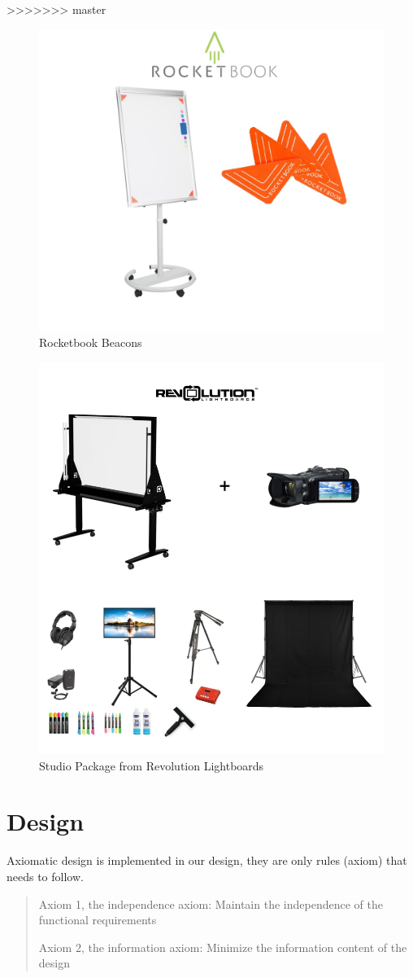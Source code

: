 \documentclass[a4paper]{jpconf}
\begin{document}
>>>>>>> master

	\begin{figure}
		\centering
		\includegraphics[width=0.7\linewidth]{becons.png}
		\caption{Rocketbook Beacons \cite{Rocketbook}}
		\label{fig:ROCK}
	\end{figure}
	
	\begin{figure}
		\centering
		\includegraphics[width=0.7\linewidth]{Revolution.png}
		\caption{ Studio Package from Revolution Lightboards \cite{Revolution}}
		\label{fig:REV}
	\end{figure}
	
	
	
	
	
\section{Design}
Axiomatic design is implemented in our design, they are only rules (axiom) that needs to follow\cite{suh2001axiomatic}.  
\begin{quote}
	Axiom 1, the independence axiom:
	Maintain the independence of the functional requirements
	
	Axiom 2, the information axiom:
	Minimize the information content of the design
\end{quote}
\end{document}
